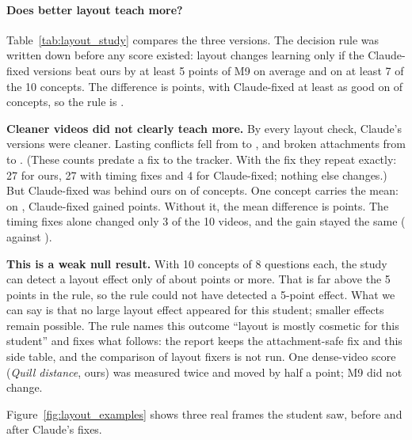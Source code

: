 \documentclass[11pt]{article}
\begin{document}
\paragraph{Does better layout teach more?} Table~\ref{tab:layout_study} compares the three versions. The decision
rule was written down before any score existed: layout changes learning only if the Claude-fixed versions beat ours by
at least 5 points of M9 on average and on at least 7 of the 10 concepts. The difference is \LSDiff{} points, with
Claude-fixed at least as good on \LSWins{} of \LSN{} concepts, so the rule is \textbf{\LSGate}.

\textbf{Cleaner videos did not clearly teach more.} By every layout check, Claude's versions were cleaner. Lasting
conflicts fell from \LSOursConflicts{} to \LSClaudeConflicts{}, and broken attachments from \LSOursAttach{} to
\LSClaudeAttach{}. (These counts predate a fix to the tracker. With the fix they repeat exactly: 27 for ours, 27 with
timing fixes and 4 for Claude-fixed; nothing else changes.) But Claude-fixed was behind ours on \LSLosses{} of \LSN{} concepts. One concept carries the
mean: on \emph{\LSTopTopic}, Claude-fixed gained \LSTopDiff{} points. Without it, the mean difference is
\LSDiffWithoutTop{} points. The timing fixes alone changed only 3 of the 10 videos, and the gain stayed the same
(\LSAutoMNine{} against \LSOursMNine{}).

\textbf{This is a weak null result.} With 10 concepts of 8 questions each, the study can detect a layout effect only
of about \NMLayoutMDE{} points or more. That is far above the 5 points in the rule, so the rule could not have
detected a 5-point effect. What we can say is that no large layout effect appeared for this student; smaller effects
remain possible. The rule names this outcome ``layout is mostly cosmetic for this student'' and fixes what follows:
the report keeps the attachment-safe fix and this side table, and the comparison of layout fixers is not run. One dense-video score (\emph{Quill distance}, ours) was measured twice and moved by half a
point; M9 did not change.



Figure~\ref{fig:layout_examples} shows three real frames the student saw, before and after Claude's fixes.
\end{document}
